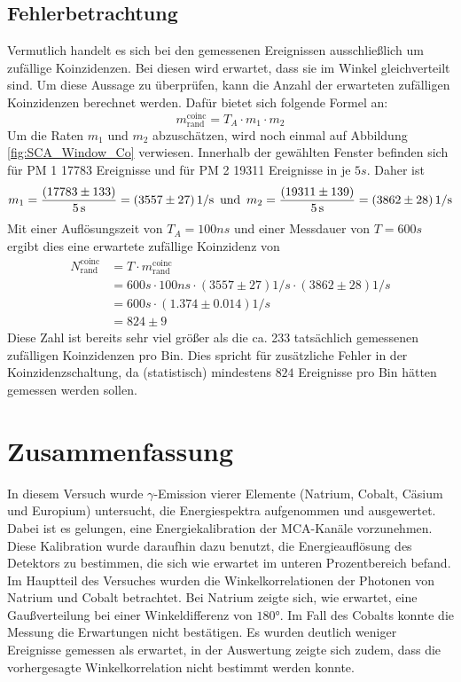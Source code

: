 \documentclass{../Misc/MontavonLaTeX/Montavon}
\begin{document}
\subsection{Fehlerbetrachtung}
Vermutlich handelt es sich bei den gemessenen Ereignissen ausschließlich um zufällige Koinzidenzen. Bei diesen wird erwartet, dass sie im Winkel gleichverteilt sind. Um diese Aussage zu überprüfen, kann die Anzahl der erwarteten zufälligen Koinzidenzen berechnet werden.
Dafür bietet sich folgende Formel an:
\[
	m^\mathrm{coinc}_\mathrm{rand} = T_A \cdot m_1 \cdot m_2
\]
Um die Raten $m_1$ und $m_2$ abzuschätzen, wird noch einmal auf Abbildung \ref{fig:SCA_Window_Co} verwiesen. Innerhalb der gewählten Fenster befinden sich für PM 1 17783 Ereignisse und für PM 2 19311 Ereignisse in je $5 \unit{s}$. Daher ist 
\[
m_1 = \frac{(17783 \pm 133)}{5 \, \mathrm{s}} = (3557 \pm 27) \, \mathrm{1/s} \enskip \mathrm{und} \enskip m_2 = \frac{(19311 \pm 139)}{5 \, \mathrm{s}} = (3862 \pm 28) \, \mathrm{1/s} 
\]
Mit einer Auflösungszeit von $T_A = 100 \unit{ns}$ und einer Messdauer von $T = 600 \unit{s}$ ergibt dies eine erwartete zufällige Koinzidenz von 
\begin{align*}
	N^\mathrm{coinc}_\mathrm{rand} &= T \cdot m^\mathrm{coinc}_\mathrm{rand} \\
	&= 600 \unit{s} \cdot 100 \unit{ns} \cdot (3557 \pm 27) \unit{1/s} \cdot (3862 \pm 28) \unit{1/s} \\
	&= 600 \unit{s} \cdot (1.374 \pm 0.014) \unit{1/s} \\
	&= 824 \pm 9
\end{align*}
Diese Zahl ist bereits sehr viel größer als die ca. 233 tatsächlich gemessenen zufälligen Koinzidenzen pro Bin. Dies spricht für zusätzliche Fehler in der Koinzidenzschaltung, da (statistisch) mindestens $824$ Ereignisse pro Bin hätten gemessen werden sollen.

\section{Zusammenfassung}
In diesem Versuch wurde $\gamma$-Emission vierer Elemente (Natrium, Cobalt, Cäsium und Europium) untersucht, die Energiespektra aufgenommen und ausgewertet. Dabei ist es gelungen, eine Energiekalibration der MCA-Kanäle vorzunehmen. 
Diese Kalibration wurde daraufhin dazu benutzt, die Energieauflösung des Detektors zu bestimmen, die sich wie erwartet im unteren Prozentbereich befand. 
Im Hauptteil des Versuches wurden die Winkelkorrelationen der Photonen von Natrium und Cobalt betrachtet. Bei Natrium zeigte sich, wie erwartet, eine Gaußverteilung bei einer Winkeldifferenz von $180 \unit{\degree}$. Im Fall des Cobalts konnte die Messung die Erwartungen nicht bestätigen. Es wurden deutlich weniger Ereignisse gemessen als erwartet, in der Auswertung zeigte sich zudem, dass die vorhergesagte Winkelkorrelation nicht bestimmt werden konnte.
\end{document}
